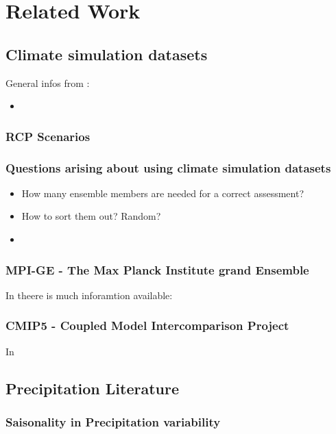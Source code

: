 \chapter{Related Work}

\section{Climate simulation datasets}

General infos from \cite{mpige}:

\begin{itemize}
  \item 
	
\end{itemize}

\subsection{RCP Scenarios}

\subsection{Questions arising about using climate simulation datasets}

\begin{itemize}
  \item How many ensemble members are needed for a correct assessment?
  \item How to sort them out? Random?
  \item 
\end{itemize}

\subsection{MPI-GE - The Max Planck Institute grand Ensemble}

In \cite{mpige} theere is much inforamtion available:

\subsection{CMIP5 - Coupled Model Intercomparison Project}

In \cite{taylor2012overview_cmip5}


\section{Precipitation Literature}

\subsection{Saisonality in Precipitation variability}


